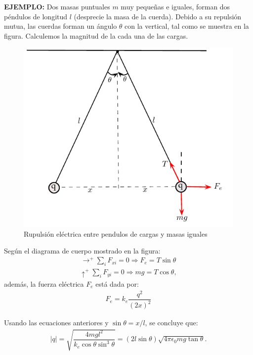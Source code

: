 \textbf{EJEMPLO:} Dos masas puntuales $m$ muy pequeñas e iguales, forman dos péndulos de longitud $l$ (desprecie la masa de la cuerda). Debido a su repulsión mutua, las cuerdas forman un ángulo $\theta$ con la vertical, tal como se muestra en la figura. Calculemos la magnitud de la cada una de las cargas.

\vspace{0.4 cm}

\begin{figure}
\begin{center}
\includegraphics[scale=0.7]{electrostatica/interaccionelectrica2}
\end{center}
\caption{Rupulsión eléctrica entre pendulos de cargas y masas iguales}
\end{figure}

Según el diagrama de cuerpo mostrado en la figura:
\begin{eqnarray}
\rightarrow^{+} \sum_{i}F_{xi}=0 \Rightarrow F_e=T\sin\theta
\end{eqnarray}
\begin{eqnarray}
\uparrow^{+} \sum_{i}F_{yi}=0 \Rightarrow mg=T\cos\theta ,
\end{eqnarray}
además, la fuerza eléctrica $F_e$ está dada por:
\begin{eqnarray}
F_e=k_e \dfrac{q^2}{(2x)^2} 
\end{eqnarray}

Usando las ecuaciones anteriores y $\sin\theta=x/l$, se concluye que:
\begin{eqnarray}
|q|=\sqrt{\dfrac{4mg l^2}{k_e\cos\theta\sin^3\theta} } =(2l\sin\theta)\sqrt{4\pi \epsilon_0 mg \tan\theta }.
\end{eqnarray}


